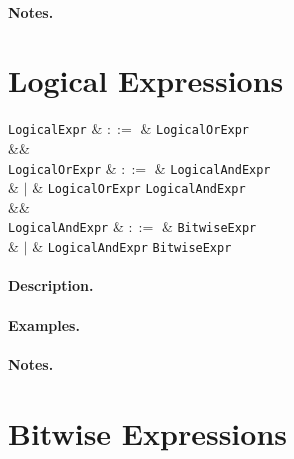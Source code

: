 \paragraph{Notes.} 


\section{Logical Expressions}
\label{c_expr_logical}

\begin{syntax}
  \verb+LogicalExpr+ & $::=$ & \verb+LogicalOrExpr+ \big[ \token{==>} \verb+LogicalExpr+\ \big]\\
  &&\\
  \verb+LogicalOrExpr+ & $::=$ & \verb+LogicalAndExpr+ \\
                           & $|$ & \verb+LogicalOrExpr+ \token{||} \verb+LogicalAndExpr+\\
  &&\\
  \verb+LogicalAndExpr+ & $::=$ & \verb+BitwiseExpr+ \\
                            & $|$ & \verb+LogicalAndExpr+ \token{\&\&} \verb+BitwiseExpr+\\
\end{syntax}

\paragraph{Description.}

\paragraph{Examples.}

\paragraph{Notes.} 


\section{Bitwise Expressions}
\label{c_expr_bitwise}


